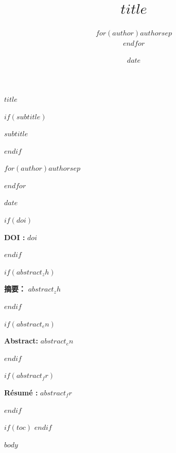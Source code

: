 \documentclass[11pt]{article}
\title{$title$}
\author{$for(author)$$author$$sep$ \\ $endfor$}
\date{$date$}
\newcommand{\doclang}{en} %
\newcommand{\ifdoclang}[3]{%
  \ifstrequal{\doclang}{#1}{#2}{#3}%
}
\theoremstyle{definition} %
\theoremstyle{plain} %
\theoremstyle{remark} %
\renewcommand{\maketitle}{
  \begin{center}
  \vspace*{1cm}
  
  \begin{minipage}{\textwidth}
  \centering
  \fontsize{20}{26}\selectfont\textbf{$title$}
  \end{minipage}
  
  \vspace{0.4cm}
  
  $if(subtitle)$   \begin{minipage}{\textwidth}
  \centering
  \fontsize{13}{16}\selectfont\itshape $subtitle$   \end{minipage}
  $endif$   
  \vspace{0.6cm}
  
  \begin{minipage}{\textwidth}
  \centering
  \Large
  $for(author)$$author$$sep$ \par $endfor$   \end{minipage}
  
  \vspace{0.6cm}
  
  \Large $date$   
  \end{center}
  \vspace{1cm}
}
\begin{document}
\maketitle

 $if(doi)$ 
\vspace{-0.5cm}
\begin{center}
\small\textbf{\ifdoclang{zh}{DOI：}{DOI :}} \href{https://doi.org/$doi$}{$doi$}
\end{center}
\vspace{0.5cm}
 $endif$ 
\thispagestyle{firstpage}

 $if(abstract_zh)$ \begin{center}
\begin{minipage}{0.85\textwidth}
\noindent \textbf{摘要：} $abstract_zh$ \end{minipage}
\end{center}
\vspace{1cm}
 $endif$ 


 $if(abstract_en)$ \begin{center}
\begin{minipage}{0.85\textwidth}
\noindent \textbf{Abstract:} $abstract_en$ \end{minipage}
\end{center}
\vspace{1cm}
 $endif$ 

 
 $if(abstract_fr)$ \begin{center}
\begin{minipage}{0.85\textwidth}
\noindent \textbf{Résumé :} $abstract_fr$ \end{minipage}
\end{center}
\vspace{1cm}
 $endif$ 
  
 $if(toc)$ \clearpage
\tableofcontents
\clearpage
 $endif$ 
\pagestyle{fancy}

 $body$ 

\clearpage
\printunsrtglossary[type=concepts, title={Concept Index}]
\clearpage
\printunsrtglossary[type=motscles, title={Keyword Index}]
\clearpage
\printunsrtglossary[type=notations, title={Notation Index}]
\end{document}
